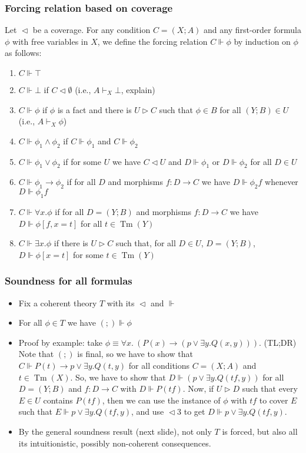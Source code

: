 \documentclass[handout,11pt]{beamer}
\newcommand{\es}{\emptyset}
\newcommand{\covd}{\mathrel{\vartriangleleft}}
\newcommand{\covs}{\mathrel{\vartriangleright}}
\DeclareMathOperator{\Tm}{Tm}
\begin{document}
\begin{frame}
\frametitle{Forcing relation based on coverage}

Let ${\covd}$ be a coverage. %
For any condition $C=(X;A)$ and any first-order formula
$\phi$ with free variables in $X$, we define the forcing relation
$C\Vdash\phi$ by induction on $\phi$ as follows:
\begin{enumerate}
\item $C\Vdash\top$

\item $C\Vdash\bot$ if $C\covd\es$ (i.e., $A\vdash_X \bot$, explain)

\item $C\Vdash\phi$ if $\phi$ is a fact and there is $U \covs C$ such that
$\phi\in B$ for all $(Y;B)\in U$ (i.e., $A\vdash_X \phi$)

\item $C\Vdash\phi_1 \land \phi_2$ if $C\Vdash\phi_1$ and $C\Vdash\phi_2$

\item $C\Vdash\phi_1 \lor \phi_2$ if for some $U$ we have
$C\covd U$ and $D\Vdash\phi_1$ or $D\Vdash\phi_2$ for all $D\in U$

\item $C\Vdash\phi_1 \to \phi_2$ if for all $D$ and morphisms $f:D\to C$
we have $D\Vdash\phi_2f$ whenever $D\Vdash\phi_1f$

\item $C\Vdash\forall x.\phi$ if for all $D=(Y;B)$ and 
morphisms $f:D\to C$ we have 
 $D\Vdash\phi [f,x=t]$ for all $t\in\Tm(Y)$
 
\item $C\Vdash\exists x.\phi$ if there is $U\covs C$ such that,
for all $D\in U$, $D=(Y;B)$, $D\Vdash\phi[x=t]$ for some $t\in\Tm(Y)$

\end{enumerate}
\end{frame}

\begin{frame}
\frametitle{Soundness for all formulas}
\begin{itemize}[<+->]
 \item Fix a coherent theory $T$ with its $\covd$ and $\Vdash$    
 \item For all $\phi\in T$ we have $(;)\Vdash\phi$
 \item Proof by example: take
 $\phi\equiv\forall x.~(P(x)\to (p\lor \exists y. Q(x,y)))$.
 (TL;DR) Note that $(;)$ is final, so we have to show that 
 $C\Vdash P(t)\to p\lor \exists y. Q(t,y)$ for all
 conditions $C=(X;A)$ and $t\in\Tm(X)$. So, we have to show
 that $D\Vdash (p\lor \exists y. Q(tf,y))$ for all $D=(Y;B)$
 and $f:D\to C$ with $D\Vdash P(tf)$. Now, if $U\covs D$ such 
 that every $E\in U$ contains $P(tf)$, then we can use
 the instance of $\phi$ with $tf$ to cover $E$
 such that $E\Vdash p\lor \exists y. Q(tf,y)$,
 and use ${\covd}3$ to get $D\Vdash p\lor \exists y. Q(tf,y)$.
 \item By the general soundness result (next slide),
 not only $T$ is forced, but also all its intuitionistic,
 possibly non-coherent consequences.
 \end{itemize}
\end{frame}
\end{document}
